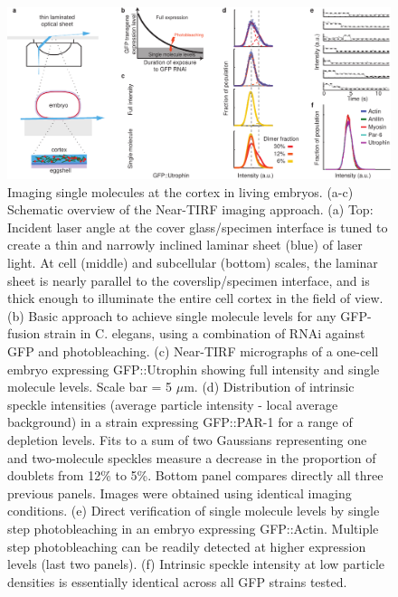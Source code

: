  \begin{figure}[h!]
 	\centering
 	\includegraphics[width=\hsize]{nmeth/Fig1}
 	\caption[Imaging single molecules at the cortex in living embryos. ]{\label{fig:fig1} Imaging single molecules at the cortex in living embryos.  (a-c) Schematic overview of the Near-TIRF imaging approach. (a) Top: Incident laser angle at the cover glass/specimen interface is tuned to create a thin and narrowly inclined laminar sheet (blue) of laser light. At cell (middle) and subcellular (bottom) scales, the laminar sheet is nearly parallel to the coverslip/specimen interface, and is thick enough to illuminate the entire cell cortex in the field of view. (b) Basic approach to achieve single molecule levels for any GFP-fusion strain in C. elegans, using a combination of RNAi against GFP and photobleaching. (c) Near-TIRF micrographs of a one-cell embryo expressing GFP::Utrophin showing full intensity and single molecule levels. Scale bar = 5 $\mu$m. (d) Distribution of intrinsic speckle intensities (average particle intensity - local average background) in a strain expressing GFP::PAR-1 for a range of depletion levels. Fits to a sum of two Gaussians representing one and two-molecule speckles measure a decrease in the proportion of doublets from 12\% to 5\%. Bottom panel compares directly all three previous panels. Images were obtained using identical imaging conditions. (e) Direct verification of single molecule levels by single step photobleaching in an embryo expressing GFP::Actin. Multiple step photobleaching can be readily detected at higher expression levels (last two panels). (f) Intrinsic speckle intensity at low particle densities is essentially identical across all GFP strains tested.}
 \end{figure}
 
 
 
